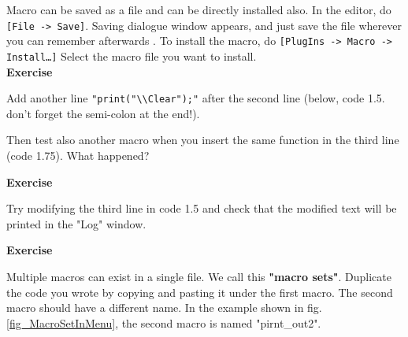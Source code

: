\documentclass[11pt,a4paper,oneside]{report}
\newenvironment{indentexercise}[1]%
{{\setlength{\leftmargin}{2em}}%
\textbf{Exercise \thesubsection-#1}%
\begin{list}{}%
	\item%
}
{\end{list}}
\newcommand{\ijmenu}[1]{\texttt{\small#1}}
\begin{document}
Macro can be saved as a file and can be directly installed also. 
In the editor, do \ijmenu{[File -> Save]}. Saving dialogue window appears, 
and just save the file wherever you can remember afterwards . 
To install the macro, do \ijmenu{[PlugIns -> Macro -> Install\ldots]} 
Select the macro file you want to install.\\

\begin{indentexercise}{1}
\item Add another line \texttt{"print("\textbackslash{}\textbackslash{}Clear");"} 
after the second line (below, code 1.5. don't forget the semi-colon at the end!). 
\item 
Then test also another macro when you insert the same function in the third line (code 1.75). 
What happened?  
\item 
\end{indentexercise}

\begin{indentexercise}{2}
\item Try modifying the third line in code 1.5 
and check that the modified text will be printed in the "Log" window. \\
\end{indentexercise}

\begin{indentexercise}{3}
\item Multiple macros can exist in a single file. We call this \textbf{"macro sets"}. 
Duplicate the code you wrote by copying and pasting it under the first macro. 
The second macro should have a different name. In the example shown in fig.
\ref{fig_MacroSetInMenu}, the second macro is named "pirnt\_out2".
\end{indentexercise}
\end{document}
